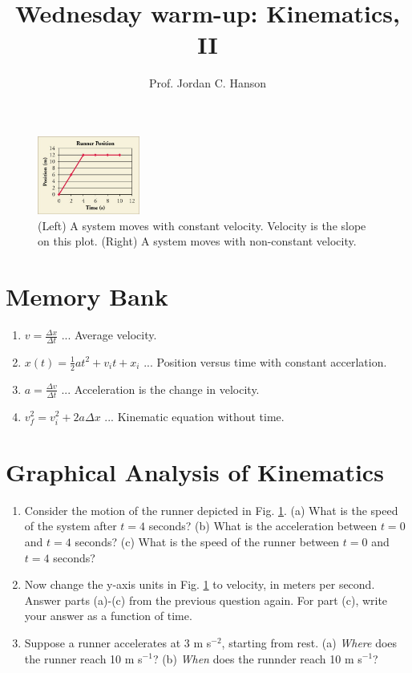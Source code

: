 \documentclass{article}
\begin{document}
\twocolumn

\title{Wednesday warm-up: Kinematics, II}
\author{Prof. Jordan C. Hanson}

\maketitle

\begin{figure}[ht]
\centering
\includegraphics[width=0.3\textwidth]{figures/run.jpeg}
\caption{\label{fig:1} (Left) A system moves with constant velocity.  Velocity is the slope on this plot. (Right) A system moves with non-constant velocity.}
\end{figure}

\section{Memory Bank}

\begin{enumerate}
\item $v = \frac{\Delta x}{\Delta t}$ ... Average velocity.
\item $x(t) = \frac{1}{2}at^2 + v_i t + x_i$ ... Position versus time with constant accerlation.
\item $a = \frac{\Delta v}{\Delta t}$ ... Acceleration is the change in velocity.
\item $v_f^2 = v_i^2 + 2 a \Delta x$ ... Kinematic equation without time.
\end{enumerate}

\section{Graphical Analysis of Kinematics}

\begin{enumerate}
\item Consider the motion of the runner depicted in Fig. \ref{fig:1}.  (a) What is the speed of the system after $t = 4$ seconds? (b) What is the acceleration between $t=0$ and $t=4$ seconds? (c) What is the speed of the runner between $t=0$ and $t=4$ seconds? \\ \vspace{3cm}
\item Now change the y-axis units in Fig. \ref{fig:1} to velocity, in meters per second.  Answer parts (a)-(c) from the previous question again.  For part (c), write your answer as a function of time. \\ \vspace{4cm}
\item Suppose a runner accelerates at 3 m s$^{-2}$, starting from rest.  (a) \textit{Where} does the runner reach 10 m s$^{-1}$?  (b) \textit{When} does the runnder reach 10 m s$^{-1}$?
\end{enumerate}
\end{document}
